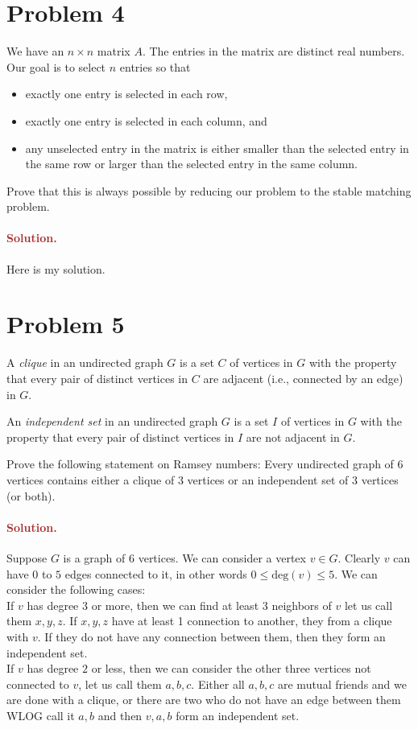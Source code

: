 \section*{Problem 4}
We have an $n \times n$ matrix $A$. The entries in the matrix are distinct real numbers. Our goal is to select $n$ entries so that
\begin{itemize}
    \item exactly one entry is selected in each row,
    \item exactly one entry is selected in each column, and
    \item any unselected entry in the matrix is either smaller than the selected entry in the same row or larger than the selected entry in the same column.
\end{itemize}
Prove that this is always possible by reducing our problem to the stable matching problem.

\paragraph{\textcolor{brown}{Solution.}}
Here is my solution.

\section*{Problem 5}
A \emph{clique} in an undirected graph $G$ is a set $C$ of vertices in $G$ with the property that every pair of distinct vertices in $C$ are adjacent (i.e., connected by an edge) in $G$.

An \emph{independent set} in an undirected graph $G$ is a set $I$ of vertices in $G$ with the property that every pair of distinct vertices in $I$ are not adjacent in $G$.

Prove the following statement on Ramsey numbers: Every undirected graph of $6$ vertices contains either a clique of $3$ vertices or an independent set of $3$ vertices (or both).

\paragraph{\textcolor{brown}{Solution.}}
Suppose $G$ is a graph of $6$ vertices. We can consider a vertex $v \in G$. Clearly $v$ can have $0$ to $5$ edges connected to it, in other words $0 \leq \text{deg}(v) \leq 5$. We can consider the following cases:\\
If $v$ has degree $3$ or more, then we can find at least 3 neighbors of $v$ let us call them $x,y,z$. If $x,y, z$ have at least 1 connection to another, they from a clique with $v$. If they do not have any connection between them, then they form an independent set.\\
If $v$ has degree $2$ or less, then we can consider the other three vertices not connected to $v$, let us call them $a,b,c$. Either all $a,b,c$ are mutual friends and we are done with a clique, or there are two who do not have an edge between them WLOG call it $a,b$ and then $v,a,b$ form an independent set.\\



